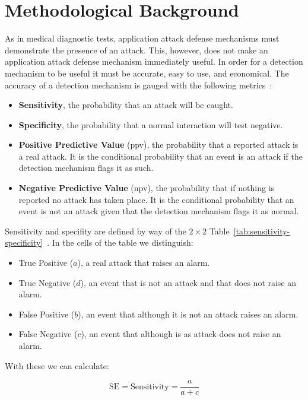 \documentclass[conference]{IEEEtran}
\begin{document}
\section{Methodological Background}

As in medical diagnostic tests, application attack defense mechanisms
must demonstrate the presence of an attack. This, however, does not
make an application attack defense mechanism immediately useful. In
order for a detection mechanism to be useful it must be accurate, easy to
use, and economical. The accuracy of a detection mechanism is gauged
with the following metrics~\cite{TDR2013,GFDLS06,A00}:
\begin{itemize}
\item {\bf Sensitivity}, the probability that an attack will be
  caught.
\item {\bf Specificity}, the probability that a normal interaction
  will test negative.
\item {\bf Positive Predictive Value} ({\sc ppv}), the probability that a
  reported attack is a real attack. It is the conditional probability
  that an event is an attack if the detection mechanism flags it as
  such. 
\item {\bf Negative Predictive Value} ({\sc npv}), the probability that if
  nothing is reported no attack has taken place. It is the conditional
  probability that an event is not an attack given that the detection
  mechanism flags it as normal.
\end{itemize}

Sensitivity and specifity are defined by way of the $2\times 2$
Table~\ref{tab:sensitivity-specificity}~\cite{linn2004}. 
In the cells of
the table we distinguish:
\begin{itemize}
\item True Positive ($a$), a real attack that raises an alarm.
\item True Negative ($d$), an event that is not an attack and that does
  not raise an alarm.
\item False Positive ($b$), an event that although it is not an attack
  raises an alarm.
\item False Negative ($c$), an event that although is as attack does
  not raise an alarm.
\end{itemize}

\noindent
With these we can calculate:

\begin{equation}
\textrm{SE} = \textrm{Sensitivity} = \frac{a}{a + c}
\end{equation}
\end{document}
